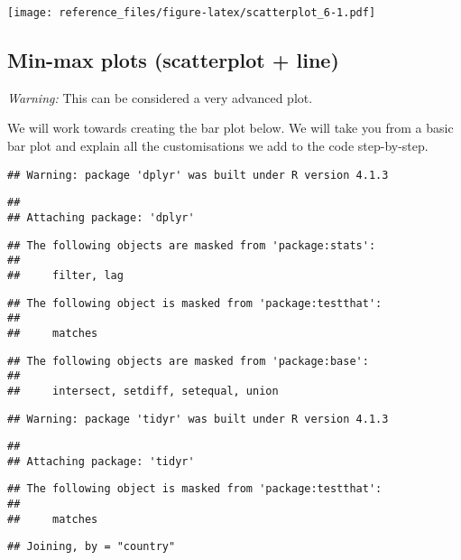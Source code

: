 \documentclass[
]{article}
\begin{document}
\texttt{[image: reference\_files/figure-latex/scatterplot\_6-1.pdf]}

\hypertarget{min-max-plots-scatterplot-line}{%
\subsection{Min-max plots (scatterplot +
line)}\label{min-max-plots-scatterplot-line}}

\emph{Warning:} This can be considered a very advanced plot.

We will work towards creating the bar plot below. We will take you from
a basic bar plot and explain all the customisations we add to the code
step-by-step.

\begin{verbatim}
## Warning: package 'dplyr' was built under R version 4.1.3
\end{verbatim}

\begin{verbatim}
## 
## Attaching package: 'dplyr'
\end{verbatim}

\begin{verbatim}
## The following objects are masked from 'package:stats':
## 
##     filter, lag
\end{verbatim}

\begin{verbatim}
## The following object is masked from 'package:testthat':
## 
##     matches
\end{verbatim}

\begin{verbatim}
## The following objects are masked from 'package:base':
## 
##     intersect, setdiff, setequal, union
\end{verbatim}

\begin{verbatim}
## Warning: package 'tidyr' was built under R version 4.1.3
\end{verbatim}

\begin{verbatim}
## 
## Attaching package: 'tidyr'
\end{verbatim}

\begin{verbatim}
## The following object is masked from 'package:testthat':
## 
##     matches
\end{verbatim}

\begin{verbatim}
## Joining, by = "country"
\end{verbatim}
\end{document}
